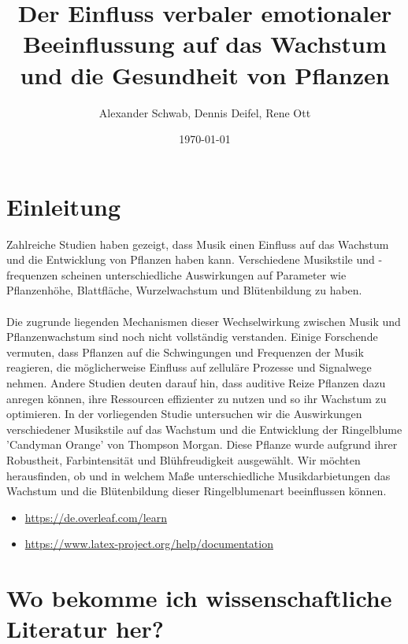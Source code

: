 \documentclass[11pt]{article}
\begin{document}
	\title{Der Einfluss verbaler emotionaler Beeinflussung auf das Wachstum und die Gesundheit von Pflanzen}
	\author{Alexander Schwab, Dennis Deifel, Rene Ott}
	\date{\today}
	\maketitle
	\tableofcontents

	\pagebreak

    \section{Einleitung}
    Zahlreiche Studien haben gezeigt, dass Musik einen Einfluss auf das Wachstum und die Entwicklung von Pflanzen haben kann. 
	Verschiedene Musikstile und -frequenzen scheinen unterschiedliche Auswirkungen auf Parameter wie Pflanzenhöhe, Blattfläche, 
	Wurzelwachstum und Blütenbildung zu haben. \\
	\\
    Die zugrunde liegenden Mechanismen dieser Wechselwirkung zwischen Musik und Pflanzenwachstum sind noch nicht vollständig 
	verstanden. Einige Forschende vermuten, dass Pflanzen auf die Schwingungen und Frequenzen der Musik reagieren, 
	die möglicherweise Einfluss auf zelluläre Prozesse und Signalwege nehmen. Andere Studien deuten darauf hin, 
	dass auditive Reize Pflanzen dazu anregen können, 
	ihre Ressourcen effizienter zu nutzen und so ihr Wachstum zu optimieren. \newline
	\newline
    In der vorliegenden Studie untersuchen wir die Auswirkungen verschiedener Musikstile auf das Wachstum und 
	die Entwicklung der Ringelblume 'Candyman Orange' von Thompson Morgan. Diese Pflanze wurde aufgrund ihrer Robustheit, 
	Farbintensität und Blühfreudigkeit ausgewählt. Wir möchten herausfinden, ob und in welchem Maße 
	unterschiedliche Musikdarbietungen das Wachstum und die Blütenbildung dieser Ringelblumenart beeinflussen können.
	\begin{itemize}
		\item \href{https://de.overleaf.com/learn}{https://de.overleaf.com/learn}
		\item \href{https://www.latex-project.org/help/documentation/}{https://www.latex-project.org/help/documentation}
	\end{itemize}

	\section{Wo bekomme ich wissenschaftliche Literatur her?}
\end{document}
